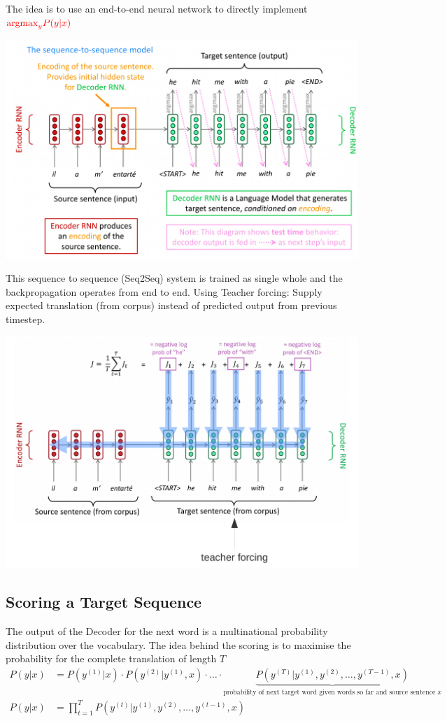 \documentclass[11pt]{article}
\begin{document}
The idea is to use an end-to-end neural network to directly implement ${\color{red}\text{argmax}_y P(y|x)}$

\begin{center}
	\includegraphics[width=0.7\linewidth]{img/encoder_decoder_machine_translation2}
\end{center}

This sequence to sequence (Seq2Seq) system is trained as single whole and the backpropagation operates from end to end. Using Teacher forcing: Supply expected translation (from corpus) instead of predicted output from previous timestep.

\begin{center}
	\includegraphics[width=0.7\linewidth]{img/Seq2Seq_Teacher_Forcing}
\end{center}

\subsection{Scoring a Target Sequence}
The output of the Decoder for the next word is a multinational probability distribution over the vocabulary. The idea behind the scoring is to maximise the probability for the complete translation of length $T$
\begin{align*}
	P(y|x) &= P(y^{(1)}|x) \cdot P(y^{(2)}|y^{(1)},x) \cdot\ldots\cdot \underbrace{P(y^{(T)}|y^{(1)},y^{(2)},\dots,y^{(T-1)},x)}_{\text{probability of next target word given words so far and source sentence $x$}}\\
	P(y|x) &= \prod_{t=1}^{T} P(y^{(t)}|y^{(1)},y^{(2)},\dots,y^{(t-1)},x)
\end{align*}
\end{document}
